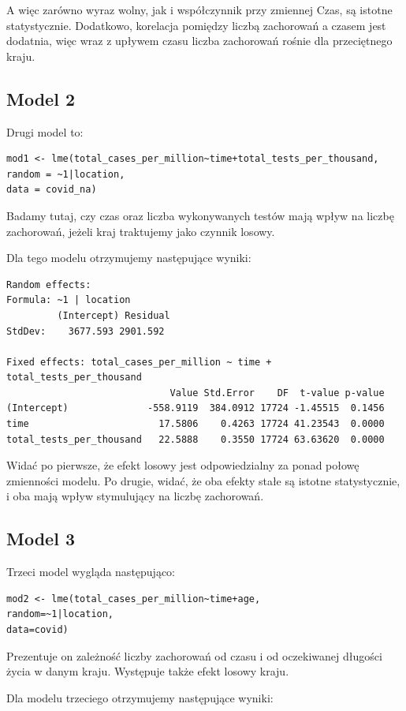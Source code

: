 \documentclass[12pt]{mwbk}
\theoremstyle{plain}
\theoremstyle{definition}
\theoremstyle{remark}
\begin{document}
A więc zarówno wyraz wolny, jak i współczynnik przy zmiennej Czas, są istotne statystycznie. Dodatkowo, korelacja pomiędzy liczbą zachorowań a czasem jest dodatnia, więc wraz z upływem czasu liczba zachorowań rośnie dla przeciętnego kraju.
\subsection{Model 2}
Drugi model to:
\begin{verbatim}
mod1 <- lme(total_cases_per_million~time+total_tests_per_thousand,
random = ~1|location,
data = covid_na)
\end{verbatim}

Badamy tutaj, czy czas oraz liczba wykonywanych testów mają wpływ na liczbę zachorowań, jeżeli kraj traktujemy jako czynnik losowy.

Dla tego modelu otrzymujemy następujące wyniki:

\begin{verbatim}
Random effects:
Formula: ~1 | location
         (Intercept) Residual
StdDev:    3677.593 2901.592

Fixed effects: total_cases_per_million ~ time + total_tests_per_thousand 
                             Value Std.Error    DF  t-value p-value
(Intercept)              -558.9119  384.0912 17724 -1.45515  0.1456
time                       17.5806    0.4263 17724 41.23543  0.0000
total_tests_per_thousand   22.5888    0.3550 17724 63.63620  0.0000
\end{verbatim}

Widać po pierwsze, że efekt losowy jest odpowiedzialny za ponad połowę zmienności modelu. Po drugie, widać, że oba efekty stałe są istotne statystycznie, i oba mają wpływ stymulujący na liczbę zachorowań.

\subsection{Model 3}

Trzeci model wygląda następująco:

\begin{verbatim}
mod2 <- lme(total_cases_per_million~time+age,
random=~1|location,
data=covid)

\end{verbatim}

Prezentuje on zależność liczby zachorowań od czasu i od oczekiwanej długości życia w danym kraju. Występuje także efekt losowy kraju.

Dla modelu trzeciego otrzymujemy następujące wyniki:
\end{document}

